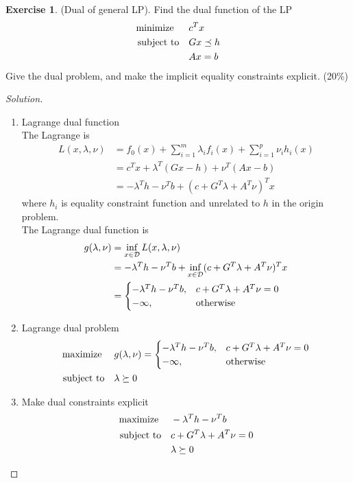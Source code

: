 \documentclass[12pt]{extarticle}
\theoremstyle{definition}
\newtheorem{exercise}{Exercise}
\begin{document}
\begin{exercise}
  (Dual of general LP). Find the dual function of the LP
  \begin{align*}
    \text{minimize\;\;}\quad& c^Tx\\
    \text{subject to}  \quad& Gx\preceq h\\
                            & Ax=b
  \end{align*}
  Give the dual problem, and make the implicit equality constraints explicit. (20\%)
\end{exercise}
\begin{proof}[Solution]
  \let\qed\relax
  $ $
  \begin{enumerate}[label=(\alph*)]
    \item Lagrange dual function\\
          The Lagrange is 
          \begin{align*}
            L(x,\lambda,\nu)&=f_0(x)+\sum_{i=1}^m\lambda_if_i(x)+\sum_{i=1}^p\nu_ih_i(x)\\
                            &=c^Tx+\lambda^T(Gx-h)+\nu^T(Ax-b)\\
                            &=-\lambda^Th-\nu^Tb+(c+G^T\lambda+A^T\nu)^Tx
          \end{align*}
          where $h_i$ is equality constraint function and unrelated to $h$ in the origin problem.\\
          The Lagrange dual function is
          \begin{align*}
            g(\lambda,\nu)&=\inf_{x\in\mathcal{D}}L(x,\lambda,\nu)\\
                          &=-\lambda^Th-\nu^Tb+\inf_{x\in\mathcal{D}}(c+G^T\lambda+A^T\nu)^Tx\\
                          &=
              \begin{cases}
                -\lambda^Th-\nu^Tb, &c+G^T\lambda+A^T\nu=0\\
                -\infty, &\text{otherwise}
              \end{cases}
          \end{align*}
    \item Lagrange dual problem
          \begin{align*}
            \text{maximize\;}\quad& g(\lambda,\nu)=
              \begin{cases}
                -\lambda^Th-\nu^Tb, &c+G^T\lambda+A^T\nu=0\\
                -\infty, &\text{otherwise}
              \end{cases}\\
            \text{subject to}\quad& \lambda\succeq 0
          \end{align*}
    \item Make dual constraints explicit
    \begin{align*}
      \text{maximize\;}\quad& -\lambda^Th-\nu^Tb\\
      \text{subject to}\quad& c+G^T\lambda+A^T\nu=0\\
                            & \lambda\succeq 0
    \end{align*}
  \end{enumerate}
\end{proof}
\end{document}
